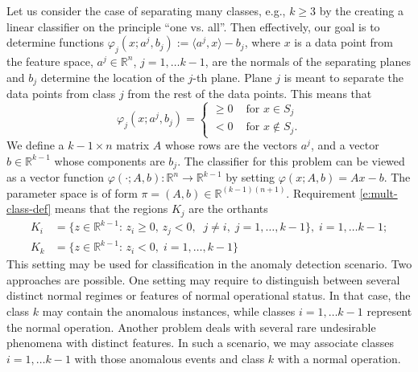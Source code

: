\documentclass[10pt,letterpaper]{article}
\newcommand{\1}{1{\hskip -2.55 pt}\hbox{I}}
\newtheorem{example}{Example}
\begin{document}
Let us consider the case of separating many classes, e.g., $k\geq 3$ by the creating a linear classifier on the principle ``one vs. all''. 
Then effectively,  our goal is to determine functions $\varphi_j(x;a^j,b_j):=\langle a^j, x \rangle - b_j$, where $x$ is a data point from the feature space, $a^j\in\mathbb R^n$, $j=1,\dots k-1$, are the normals of the separating planes and $b_j$ determine the location of the $j$-th plane. Plane $j$ is meant to separate the data points from class $j$ from the rest of the data points. This means that
\begin{equation}
\label{e:mult-class-def}
\varphi_j(x;a^j,b_j) =\begin{cases}\geq 0 & \text{ for } x\in S_j\\
 < 0 & \text{ for } x\not\in S_j.
\end{cases}
\end{equation}
We define a $k-1\times n$ matrix $A$ whose rows are the vectors $a^j$, and a vector $b\in\mathbb R^{k-1}$ whose components are $b_j$. The classifier for this problem can be viewed as a vector function $\varphi(\cdot; A,b): \mathbb R^n\to \mathbb R^{k-1}$ by setting $\varphi (x; A,b) = Ax-b$. 
The parameter space is of form $\pi=(A,b)\in\mathbb R^{(k-1)(n+1)}$. 
Requirement \eqref{e:mult-class-def} means that
the regions $K_j$ are the orthants 
\begin{align*}
K_i & = \{z\in\mathbb R^{k-1}: \, z_i\geq 0, \, z_j < 0,\;\; j\ne i, \;j =1,\dots, k-1\}, \; i=1,\dots k-1;\\
K_k & = \{z\in\mathbb R^{k-1}: \, z_i < 0, \; i =1,\dots, k-1\}
\end{align*}
This setting may be used for classification in the anomaly detection scenario. Two approaches are possible. One setting may require to distinguish between several distinct normal regimes or features of normal operational status. In that case, the class $k$ may contain the anomalous 
instances, while classes $i=1,\dots k-1$ represent the normal operation. Another problem deals with several rare undesirable phenomena with distinct features.
In such a scenario, we may associate classes $i=1,\dots k-1$ with those anomalous events and class $k$ with a normal operation. 
\end{document}
